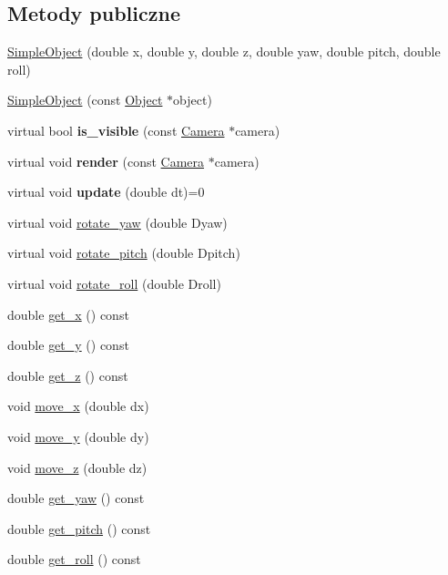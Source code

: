 \subsection*{Metody publiczne}
\begin{DoxyCompactItemize}
\item 
\hyperlink{class_simple_object_ac3546137e54ecbd63af642987ed7c3e1}{Simple\+Object} (double x, double y, double z, double yaw, double pitch, double roll)
\item 
\hyperlink{class_simple_object_aa5c0c6312bf39207eccbe3816218c16c}{Simple\+Object} (const \hyperlink{class_object}{Object} $\ast$object)
\item 
virtual bool {\bfseries is\+\_\+visible} (const \hyperlink{class_camera}{Camera} $\ast$camera)\hypertarget{class_simple_object_a1ecfe7d2d9f54db74b5add72bde4722f}{}\label{class_simple_object_a1ecfe7d2d9f54db74b5add72bde4722f}

\item 
virtual void {\bfseries render} (const \hyperlink{class_camera}{Camera} $\ast$camera)\hypertarget{class_simple_object_a3a27ab5c46fb29fe77bd7e8bd6a3f363}{}\label{class_simple_object_a3a27ab5c46fb29fe77bd7e8bd6a3f363}

\item 
virtual void {\bfseries update} (double dt)=0\hypertarget{class_simple_object_ae6172a3cb957cb595fd77effbb051bde}{}\label{class_simple_object_ae6172a3cb957cb595fd77effbb051bde}

\item 
virtual void \hyperlink{class_simple_object_a87202d586ed9a3c115dedcad2911f7b7}{rotate\+\_\+yaw} (double Dyaw)
\item 
virtual void \hyperlink{class_simple_object_aaf69740e2c939f7e0b51924a89422f0c}{rotate\+\_\+pitch} (double Dpitch)
\item 
virtual void \hyperlink{class_simple_object_ae2df7e8abff1303b55f559102b08a2c5}{rotate\+\_\+roll} (double Droll)
\item 
double \hyperlink{class_simple_object_a41bbdfe52dc20d88ba6511208867d908}{get\+\_\+x} () const 
\item 
double \hyperlink{class_simple_object_ac1f8fa29e45089a4110848ddaf440322}{get\+\_\+y} () const 
\item 
double \hyperlink{class_simple_object_a4a7931d70d156e0254d3ccfa1a6f2f4d}{get\+\_\+z} () const 
\item 
void \hyperlink{class_simple_object_a4c07cb27c02089325fd65dee3218563c}{move\+\_\+x} (double dx)
\item 
void \hyperlink{class_simple_object_acb544eaea6d132ddf29db57ada174920}{move\+\_\+y} (double dy)
\item 
void \hyperlink{class_simple_object_a9d5854c99305702d0b1ceaf7a24907fc}{move\+\_\+z} (double dz)
\item 
double \hyperlink{class_simple_object_a5fdb2d7aa58fcad8acb1fcaf906dce15}{get\+\_\+yaw} () const 
\item 
double \hyperlink{class_simple_object_a5fdf130ef90fe9a645887f6735f2ce70}{get\+\_\+pitch} () const 
\item 
double \hyperlink{class_simple_object_adf120ce1354dbbaed33b437206936541}{get\+\_\+roll} () const 
\end{DoxyCompactItemize}
